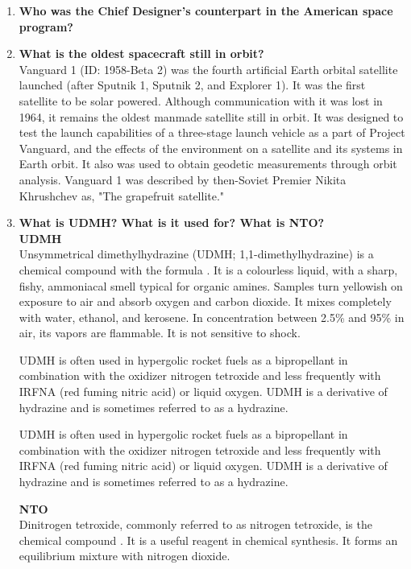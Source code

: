 \documentclass{article}
\begin{document}
\begin{enumerate}
	\item {\bf Who was the Chief Designer’s counterpart in the American space program?}\\
	
	\item {\bf What is the oldest spacecraft still in orbit?}\\
	
Vanguard 1 (ID: 1958-Beta 2) was the fourth artificial Earth orbital satellite launched (after Sputnik 1, Sputnik 2, and Explorer 1). It was the first satellite to be solar powered. Although communication with it was lost in 1964, it remains the oldest manmade satellite still in orbit. It was designed to test the launch capabilities of a three-stage launch vehicle as a part of Project Vanguard, and the effects of the environment on a satellite and its systems in Earth orbit. It also was used to obtain geodetic measurements through orbit analysis. Vanguard 1 was described by then-Soviet Premier Nikita Khrushchev as, "The grapefruit satellite." \cite{vanguard1}
	
	\item {{\bf What is UDMH? What is it used for? What is NTO?}}\\

{\bf UDMH}\\
Unsymmetrical dimethylhydrazine (UDMH; 1,1-dimethylhydrazine) is a chemical compound with the formula . It is a colourless liquid, with a sharp, fishy, ammoniacal smell typical for organic amines. Samples turn yellowish on exposure to air and absorb oxygen and carbon dioxide. It mixes completely with water, ethanol, and kerosene. In concentration between 2.5\% and 95\% in air, its vapors are flammable. It is not sensitive to shock.

UDMH is often used in hypergolic rocket fuels as a bipropellant in combination with the oxidizer nitrogen tetroxide and less frequently with IRFNA (red fuming nitric acid) or liquid oxygen. UDMH is a derivative of hydrazine and is sometimes referred to as a hydrazine.

UDMH is often used in hypergolic rocket fuels as a bipropellant in combination with the oxidizer nitrogen tetroxide and less frequently with IRFNA (red fuming nitric acid) or liquid oxygen. UDMH is a derivative of hydrazine and is sometimes referred to as a hydrazine. \cite{udmh}

{\bf NTO}\\
Dinitrogen tetroxide, commonly referred to as nitrogen tetroxide, is the chemical compound . It is a useful reagent in chemical synthesis. It forms an equilibrium mixture with nitrogen dioxide.


\end{enumerate}
\end{document}
